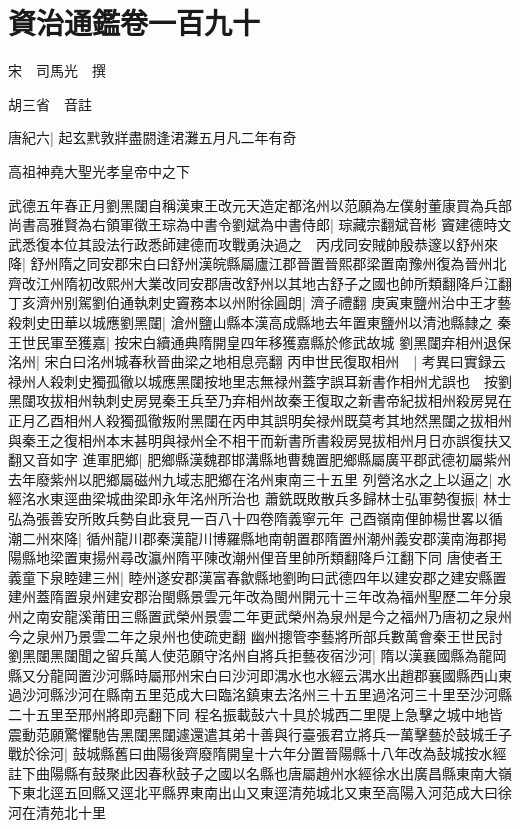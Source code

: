 \section{資治通鑑卷一百九十}
宋　司馬光　撰

胡三省　音註

唐紀六|{
	起玄黓敦牂盡閼逢涒灘五月凡二年有奇}


高祖神堯大聖光孝皇帝中之下

武德五年春正月劉黑闥自稱漢東王改元天造定都洺州以范願為左僕射董康買為兵部尚書高雅賢為右領軍徵王琮為中書令劉斌為中書侍郎|{
	琮藏宗翻斌音彬}
竇建德時文武悉復本位其設法行政悉師建德而攻戰勇決過之　丙戌同安賊帥殷恭邃以舒州來降|{
	舒州隋之同安郡宋白曰舒州漢皖縣屬廬江郡晉置晉熙郡梁置南豫州復為晉州北齊改江州隋初改熙州大業改同安郡唐改舒州以其地古舒子之國也帥所類翻降戶江翻}
丁亥濟州别駕劉伯通執刺史竇務本以州附徐圓朗|{
	濟子禮翻}
庚寅東鹽州治中王才藝殺刺史田華以城應劉黑闥|{
	滄州鹽山縣本漢高成縣地去年置東鹽州以清池縣隸之}
秦王世民軍至獲嘉|{
	按宋白續通典隋開皇四年移獲嘉縣於修武故城}
劉黑闥弃相州退保洺州|{
	宋白曰洺州城春秋晉曲梁之地相息亮翻}
丙申世民復取相州　|{
	考異曰實録云禄州人殺刺史獨孤徹以城應黑闥按地里志無禄州蓋字誤耳新書作相州尤誤也　按劉黑闥攻拔相州執刺史房晃秦王兵至乃弃相州故秦王復取之新書帝紀拔相州殺房晃在正月乙酉相州人殺獨孤徹叛附黑闥在丙申其誤明矣禄州既莫考其地然黑闥之拔相州與秦王之復相州本末甚明與禄州全不相干而新書所書殺房晃拔相州月日亦誤復扶又翻又音如字}
進軍肥鄉|{
	肥鄉縣漢魏郡邯溝縣地曹魏置肥鄉縣屬廣平郡武德初屬紫州去年廢紫州以肥鄉屬磁州九域志肥鄉在洺州東南三十五里}
列營洺水之上以逼之|{
	水經洺水東逕曲梁城曲梁即永年洺州所治也}
蕭銑既敗散兵多歸林士弘軍勢復振|{
	林士弘為張善安所敗兵勢自此衰見一百八十四卷隋義寧元年}
己酉嶺南俚帥楊世畧以循潮二州來降|{
	循州龍川郡秦漢龍川博羅縣地南朝置郡隋置州潮州義安郡漢南海郡掲陽縣地梁置東揚州尋改瀛州隋平陳改潮州俚音里帥所類翻降戶江翻下同}
唐使者王義童下泉睦建三州|{
	睦州遂安郡漢富春歙縣地劉昫曰武德四年以建安郡之建安縣置建州蓋隋置泉州建安郡治閩縣景雲元年改為閩州開元十三年改為福州聖歷二年分泉州之南安龍溪莆田三縣置武榮州景雲二年更武榮州為泉州是今之福州乃唐初之泉州今之泉州乃景雲二年之泉州也使疏吏翻}
幽州摠管李藝將所部兵數萬會秦王世民討劉黑闥黑闥聞之留兵萬人使范願守洺州自將兵拒藝夜宿沙河|{
	隋以漢襄國縣為龍岡縣又分龍岡置沙河縣時屬邢州宋白曰沙河即湡水也水經云湡水出趙郡襄國縣西山東過沙河縣沙河在縣南五里范成大曰臨洺鎮東去洺州三十五里過洺河三十里至沙河縣二十五里至邢州將即亮翻下同}
程名振載鼔六十具於城西二里隄上急擊之城中地皆震動范願驚懼馳告黑闥黑闥遽還遣其弟十善與行臺張君立將兵一萬擊藝於鼓城壬子戰於徐河|{
	鼓城縣舊曰曲陽後齊廢隋開皇十六年分置晉陽縣十八年改為鼔城按水經註下曲陽縣有鼓聚此因春秋鼓子之國以名縣也唐屬趙州水經徐水出廣昌縣東南大嶺下東北逕五回縣又逕北平縣界東南出山又東逕清苑城北又東至高陽入河范成大曰徐河在清苑北十里}
